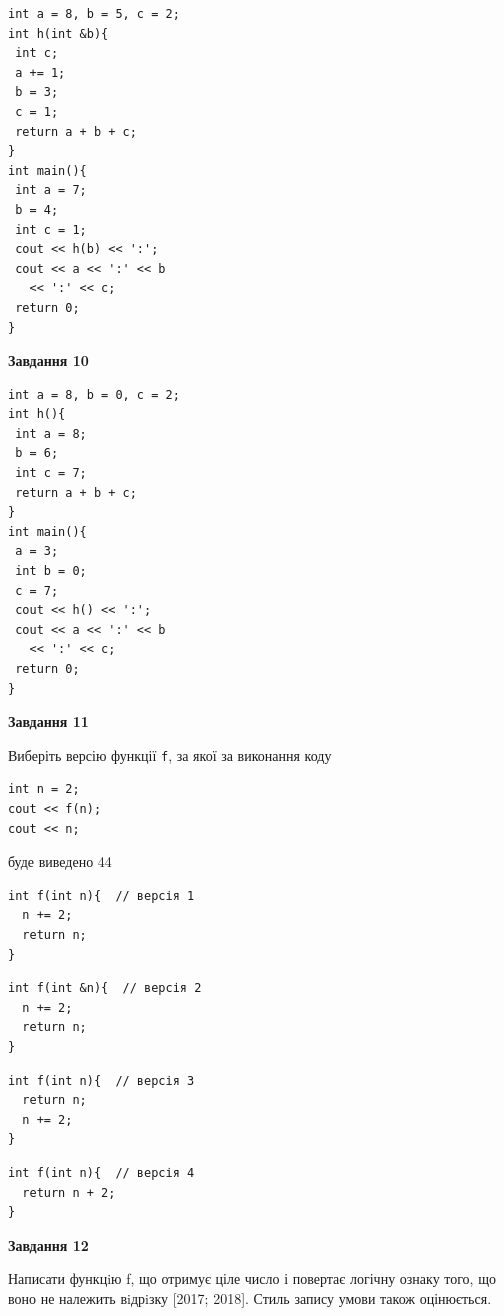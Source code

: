 \documentclass[12pt, ukrainian]{article}
\def\code#1{\Verb!#1!}
\begin{document}
{\begin {large}
\begin{minipage}[t]{7.0cm}
\begin{verbatim}
int a = 8, b = 5, c = 2;
int h(int &b){
 int c;
 a += 1;
 b = 3;
 c = 1;
 return a + b + c;
}
int main(){
 int a = 7;
 b = 4;
 int c = 1;
 cout << h(b) << ':';
 cout << a << ':' << b 
   << ':' << c;
 return 0;
}
\end{verbatim}



\begin{center}
\textbf{Завдання 10}
\end{center}
\vspace{-8mm}

\begin{verbatim}
int a = 8, b = 0, c = 2;
int h(){
 int a = 8;
 b = 6;
 int c = 7;
 return a + b + c;
}
int main(){
 a = 3;
 int b = 0;
 c = 7;
 cout << h() << ':';
 cout << a << ':' << b 
   << ':' << c;
 return 0;
}
\end{verbatim}

\end{minipage}
\vline \hspace{1mm}
\begin{minipage}[t]{11.0cm}

\begin{center}
\textbf{Завдання 11}
\end{center}
Виберіть версію функції \code{f}, за якої за виконання коду
\begin{verbatim}
int n = 2;
cout << f(n);
cout << n;
\end{verbatim}

буде виведено 44

\begin{verbatim}
int f(int n){  // версія 1
  n += 2;
  return n;
}
\end{verbatim}

\vspace{-8mm}\begin{verbatim}
int f(int &n){  // версія 2
  n += 2;
  return n;
}
\end{verbatim}

\vspace{-8mm}\begin{verbatim}
int f(int n){  // версія 3
  return n;
  n += 2;
}
\end{verbatim}

\vspace{-8mm}\begin{verbatim}
int f(int n){  // версія 4
  return n + 2;
}
\end{verbatim}



\begin{center}
\textbf{Завдання 12}
\end{center}

Написати функцiю f, що отримує ціле число і повертає логічну ознаку того, що воно не належить вiдрiзку [2017; 2018]. Стиль запису умови також оцінюється.\par

\end{minipage}

\end {large}}
\newpage
\end{document}
